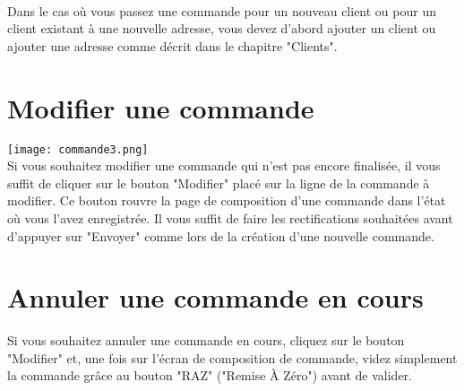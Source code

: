 \paragraph{}
Dans le cas où vous passez une commande pour un nouveau client ou pour un client
existant à une nouvelle adresse, vous devez d'abord ajouter un client ou ajouter
une adresse comme décrit dans le chapitre "Clients".

\section{Modifier une commande}

\texttt{[image: commande3.png]}\\

Si vous souhaitez modifier une commande qui n'est pas encore finalisée, il
vous suffit de cliquer sur le bouton "Modifier" placé sur la ligne de la
commande à modifier. Ce bouton rouvre la page de composition d'une commande dans
l'état où vous l'avez enregistrée. Il vous suffit de faire les rectifications
souhaitées avant d'appuyer sur "Envoyer" comme lors de la création d'une
nouvelle commande.

\section{Annuler une commande en cours}
Si vous souhaitez annuler une commande en cours, cliquez sur le bouton
"Modifier" et, une fois sur l'écran de composition de commande, videz simplement
la commande grâce au bouton "RAZ" ("Remise À Zéro") avant de valider.

